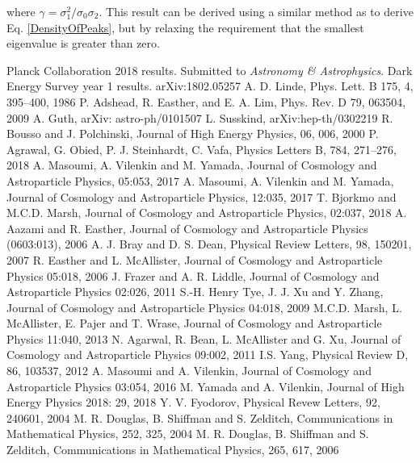\documentclass[12pt]{article}
\begin{document}
\noindent where $\gamma = \sigma_1^2/\sigma_0\sigma_2$. This result can be derived using a similar method as to derive Eq. \ref{DensityOfPeaks}, but by relaxing the requirement that the smallest eigenvalue is greater than zero.

\begin{thebibliography}{99}
 Planck Collaboration 2018 results. Submitted to \emph{Astronomy \& Astrophysics}.
 Dark Energy Survey year 1 results. arXiv:1802.05257
 A. D. Linde, Phys. Lett. B 175, 4, 395--400, 1986
 P. Adshead, R. Easther, and E. A. Lim, Phys. Rev. D 79, 063504, 2009
 A. Guth, arXiv: astro-ph/0101507
 L. Susskind, arXiv:hep-th/0302219
 R. Bousso and J. Polchinski, Journal of High Energy Physics, 06, 006, 2000
 P. Agrawal, G. Obied, P. J. Steinhardt, C. Vafa, Physics Letters B, 784, 271--276, 2018
 A. Masoumi, A. Vilenkin and M. Yamada, Journal of Cosmology and Astroparticle Physics, 05:053, 2017
 A. Masoumi, A. Vilenkin and M. Yamada, Journal of Cosmology and Astroparticle Physics, 12:035, 2017
 T. Bjorkmo and M.C.D. Marsh, Journal of Cosmology and Astroparticle Physics, 02:037, 2018
 A. Aazami and R. Easther, Journal of Cosmology and Astroparticle Physics (0603:013), 2006
 A. J. Bray and D. S. Dean, Physical Review Letters, 98, 150201, 2007
 R. Easther and L. McAllister, Journal of Cosmology and Astroparticle Physics 05:018, 2006
 J. Frazer and A. R. Liddle, Journal of Cosmology and Astroparticle Physics 02:026, 2011
 S.-H. Henry Tye, J. J. Xu and Y. Zhang, Journal of Cosmology and Astroparticle Physics 04:018, 2009
 M.C.D. Marsh, L. McAllister, E. Pajer and T. Wrase, Journal of Cosmology and Astroparticle Physics 11:040, 2013
 N. Agarwal, R. Bean, L. McAllister and G. Xu, Journal of Cosmology and Astroparticle Physics 09:002, 2011
 I.S. Yang, Physical Review D, 86, 103537, 2012
 A. Masoumi and A. Vilenkin, Journal of Cosmology and Astroparticle Physics 03:054, 2016
 M. Yamada and A. Vilenkin, Journal of High Energy Physics 2018: 29, 2018
 Y. V. Fyodorov, Physical Revew Letters, 92, 240601, 2004
 M. R. Douglas, B. Shiffman and S. Zelditch, Communications in Mathematical Physics, 252, 325, 2004
 M. R. Douglas, B. Shiffman and S. Zelditch, Communications in Mathematical Physics, 265, 617, 2006 

\end{thebibliography}
\end{document}

